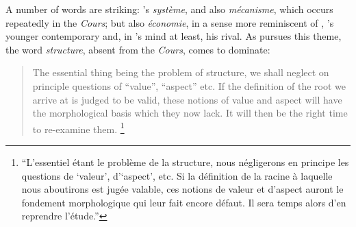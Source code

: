 \documentclass[output=paper]{langscibook}
\begin{document}
A number of words are striking: {\Saussure}'s \emph{système}, and also \emph{mécanisme}, which occurs repeatedly in the \emph{Cours}; but also \emph{économie}, in a sense more reminiscent of {\Martinet}, {\Benveniste}'s younger contemporary and, in {\Martinet}'s mind at least, his rival. As {\Benveniste} pursues this theme, the word \emph{structure}, absent from the \emph{Cours}, comes to dominate:

\begin{quotation}
The essential thing being the problem of structure, we shall neglect on principle questions of ``value'', ``aspect'' etc. If the definition of the root we arrive at is judged to be valid, these notions of value and aspect will have the morphological basis which they now lack. It will then be the right time to re-examine them. \citep[147--148]{Benveniste1935}\footnote{``L'essentiel étant le problème de la structure, nous négligerons en principe les questions de `valeur', d'`aspect', etc. Si la définition de la racine à laquelle nous aboutirons est jugée valable, ces notions de valeur et d’aspect auront le fondement morphologique qui leur fait encore défaut. Il sera temps alors d’en reprendre l'étude.''}
\end{quotation}
\end{document}

